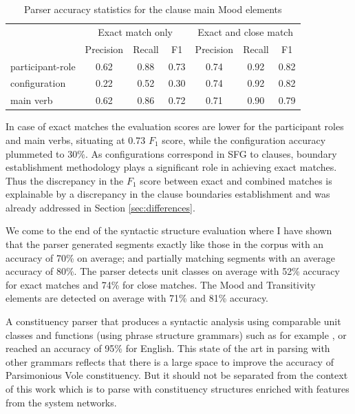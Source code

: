     \begin{table}[!ht]
    \centering
    \begin{tabular}{lcccccc}
    \toprule
     & \multicolumn{3}{c}{Exact match only} & \multicolumn{3}{c}{Exact and close match} \\ \cline{2-7} 
     & Precision & Recall & F1 & Precision & Recall & F1 \\ 
    \midrule
    participant-role &       0.62 &    0.88 & 0.73 &       0.74 &    0.92 & 0.82 \\
    configuration    &       0.22 &    0.52 & 0.30 &       0.74 &    0.92 & 0.82 \\
    main verb        &       0.62 &    0.86 & 0.72 &       0.71 &    0.90 & 0.79 \\ 
    \bottomrule
    \end{tabular}
    \caption{Parser accuracy statistics for the clause main Mood elements}
    \label{tab:unit-elements-transitivity-combined-F1}
    \end{table}
    
    In case of exact matches the evaluation scores are lower for the participant roles and main verbs, situating at 0.73 $F_1$ score, while the configuration accuracy plummeted to 30\%. As configurations correspond in SFG to clauses, boundary establishment methodology plays a significant role in achieving exact matches. Thus the discrepancy in the $F_1$ score between exact and combined matches is explainable by a discrepancy in the clause boundaries establishment and was already addressed in Section \ref{sec:differences}. 
    
    We come to the end of the syntactic structure evaluation where I have shown that the parser generated segments exactly like those in the corpus with an accuracy of 70\% on average; and partially matching segments with an average accuracy of 80\%. The parser detects unit classes on average with 52\% accuracy for exact matches and 74\% for close matches. The Mood and Transitivity elements are detected on average with 71\% and 81\% accuracy. 
    
    A constituency parser that produces a syntactic analysis using comparable unit classes and functions (using phrase structure grammars) such as for example \citet{chen2014fast}, \citet{stern2017minimal} or \citet{kitaev2018multilingual} reached an accuracy of 95\% for English. This state of the art in parsing with other grammars reflects that there is a large space to improve the accuracy of Parsimonious Vole constituency. But it should not be separated from the context of this work which is to parse with constituency structures enriched with features from the system networks. %
    
